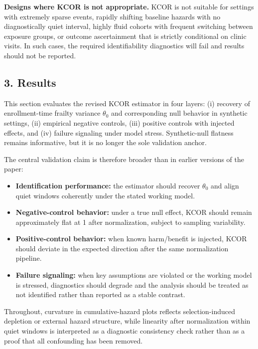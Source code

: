 \documentclass[
]{article}
\providecommand{\tightlist}{%
  \setlength{\itemsep}{0pt}\setlength{\parskip}{0pt}}
\begin{document}
\textbf{Designs where KCOR is not appropriate.} KCOR is not suitable for
settings with extremely sparse events, rapidly shifting baseline hazards
with no diagnostically quiet interval, highly fluid cohorts with
frequent switching between exposure groups, or outcome ascertainment
that is strictly conditional on clinic visits. In such cases, the
required identifiability diagnostics will fail and results should not be
reported.

\subsection{3. Results}\label{results}

This section evaluates the revised KCOR estimator in four layers: (i)
recovery of enrollment-time frailty variance \(\theta_0\) and
corresponding null behavior in synthetic settings, (ii) empirical
negative controls, (iii) positive controls with injected effects, and
(iv) failure signaling under model stress. Synthetic-null flatness
remains informative, but it is no longer the sole validation anchor.

The central validation claim is therefore broader than in earlier
versions of the paper:

\begin{itemize}
\tightlist
\item
  \textbf{Identification performance:} the estimator should recover
  \(\theta_0\) and align quiet windows coherently under the stated
  working model.
\item
  \textbf{Negative-control behavior:} under a true null effect, KCOR
  should remain approximately flat at 1 after normalization, subject to
  sampling variability.
\item
  \textbf{Positive-control behavior:} when known harm/benefit is
  injected, KCOR should deviate in the expected direction after the same
  normalization pipeline.
\item
  \textbf{Failure signaling:} when key assumptions are violated or the
  working model is stressed, diagnostics should degrade and the analysis
  should be treated as not identified rather than reported as a stable
  contrast.
\end{itemize}

Throughout, curvature in cumulative-hazard plots reflects
selection-induced depletion or external hazard structure, while
linearity after normalization within quiet windows is interpreted as a
diagnostic consistency check rather than as a proof that all confounding
has been removed.
\end{document}
